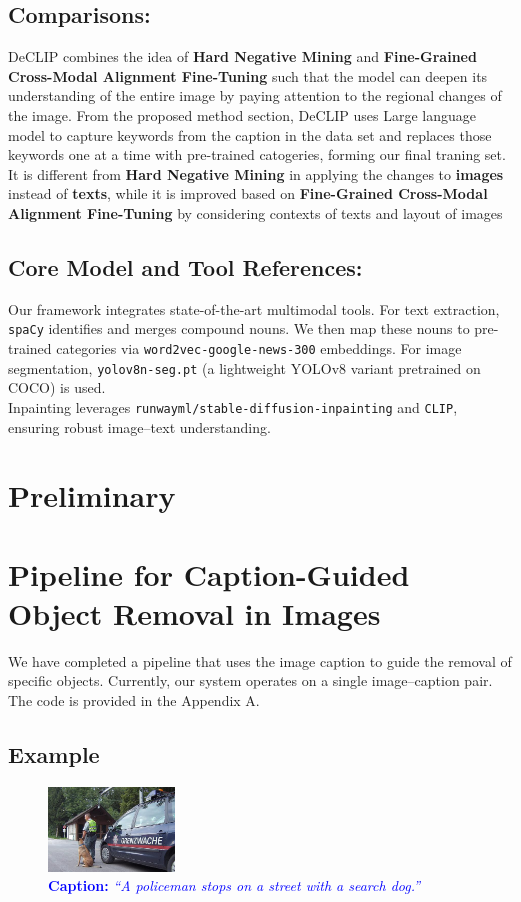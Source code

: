 \documentclass[11pt,letterpaper]{article}
\begin{document}
\subsection{Comparisons:}
DeCLIP combines the idea of \textbf{Hard Negative Mining} and \textbf{Fine-Grained Cross-Modal Alignment Fine-Tuning} such that the model can deepen its understanding of the entire image by paying attention to the regional changes of the image. From the proposed method section, DeCLIP uses Large language model to capture keywords from the caption in the data set and replaces those keywords one at a time with pre-trained catogeries, forming our final traning set. It is different from \textbf{Hard Negative Mining} in applying the changes to \textbf{images} instead of \textbf{texts}, while it is improved based on \textbf{Fine-Grained Cross-Modal Alignment Fine-Tuning} by considering contexts of texts and layout of images
\subsection{Core Model and Tool References:}
Our framework integrates state-of-the-art multimodal tools. For text extraction, \texttt{spaCy} identifies and merges compound nouns. We then map these nouns to pre-trained categories via \texttt{word2vec-google-news-300} embeddings. For image segmentation, \texttt{yolov8n-seg.pt} (a lightweight YOLOv8 variant pretrained on COCO) is used.\\ Inpainting leverages \texttt{runwayml/stable-diffusion-inpainting} and \texttt{CLIP}, ensuring robust image–text understanding.





\section{Preliminary}


\section*{Pipeline for Caption-Guided Object Removal in Images}

We have completed a pipeline that uses the image caption to guide the removal of specific objects. Currently, our system operates on a single image--caption pair. The code is provided in the Appendix A.

\subsection*{Example}
\noindent
   \begin{figure}[h]
    \centering
    \includegraphics[width=0.3\textwidth]{midterm_report/assets/oriIMG.jpg}
    \caption{\textcolor{blue}{\textbf{Caption:} \emph{``A policeman stops on a street with a search dog.''}}}
    \label{fig:original_image}
\end{figure}
\end{document}
